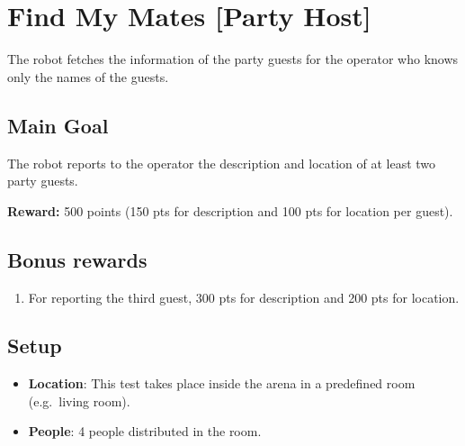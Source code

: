 \section{Find My Mates [Party Host]}

The robot fetches the information of the party guests for the operator who knows only the names of the guests.


\subsection{Main Goal}

The robot reports to the operator the description and location of at least two party guests.

\noindent\textbf{Reward:} 500 points (150 pts for description and 100 pts for location per guest).

\subsection{Bonus rewards}
\begin{enumerate}[nosep]
	\item For reporting the third guest, 300 pts for description and 200 pts for location.
\end{enumerate}


\subsection{Setup}
\begin{itemize}
	\item \textbf{Location}: This test takes place inside the arena in a predefined room (e.g.~living room).

	\item \textbf{People}: 4 people distributed in the room.
\end{itemize}

